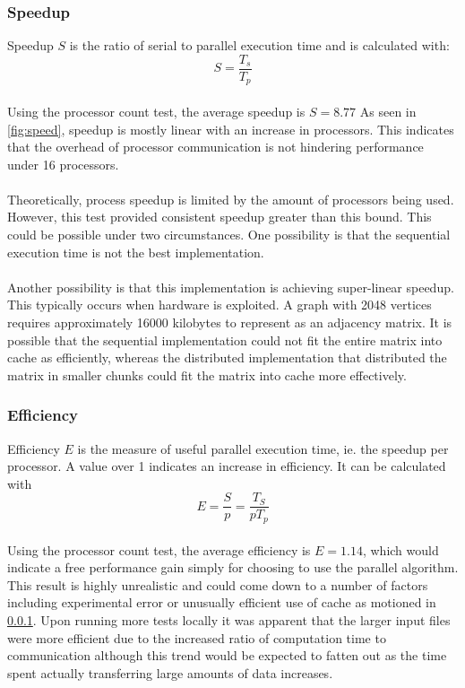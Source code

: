 \documentclass[12pt]{article}
\begin{document}
\subsubsection{Speedup}
\label{speeedup}
Speedup \(S\) is the ratio of serial to parallel execution time and is calculated with:
\[S = \frac{T_s}{T_p}\] \\
Using the processor count test, the average speedup is \(S = 8.77\)
As seen in \ref{fig:speed}, speedup is mostly linear with an increase in processors. This indicates that the overhead of processor communication is not hindering performance under 16 processors.
\\\\
Theoretically, process speedup is limited by the amount of processors being used. However, this test provided consistent speedup greater than this bound. This could be possible under two circumstances. One possibility is that the sequential execution time is not the best implementation.
\\\\
Another possibility is that this implementation is achieving super-linear speedup. This typically occurs when hardware is exploited. A graph with 2048 vertices requires approximately 16000 kilobytes to represent as an adjacency matrix. It is possible that the sequential implementation could not fit the entire matrix into cache as efficiently, whereas the distributed implementation that distributed the matrix in smaller chunks could fit the matrix into cache more effectively.

\subsubsection{Efficiency}
Efficiency \(E\) is the measure of useful parallel execution time, ie. the speedup per processor. A value over 1 indicates an increase in efficiency. It can be calculated with
\[E = \frac{S}{p} = \frac{T_S}{pT_p}\] \\
Using the processor count test, the average efficiency is \(E = 1.14\), which would indicate a free performance gain simply for choosing to use the parallel algorithm. This result is highly unrealistic and could come down to a number of factors including experimental error or unusually efficient use of cache as motioned in \ref{speeedup}. Upon running more tests locally it was apparent that the larger input files were more efficient due to the increased ratio of computation time to communication although this trend would be expected to fatten out as the time spent actually transferring large amounts of data increases. 
\end{document}
